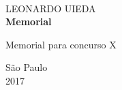 \begin{titlepage}
\begin{center}

\hspace{\fill}
\\[3cm]

{\large LEONARDO UIEDA}
\\[3cm]


{\Large \textbf{Memorial}}
\\[3cm]


\begin{flushright}
\parbox{10cm}{\large
Memorial para concurso X}
\end{flushright}
\vfill



{\large São Paulo
\\[0.2cm]
2017}

\end{center}
\end{titlepage}

